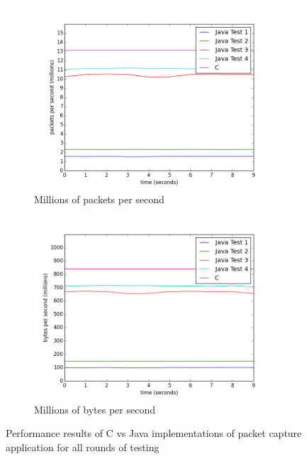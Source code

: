 \documentclass[final_report.tex]{subfiles}
\begin{document}
\begin{figure}[H]
	\centering
	\begin{subfigure}{0.5\textwidth}
		\includegraphics[width=\textwidth]{../../data/pctest1/packets.png}
		\caption{Millions of packets per second}
		\label{fig:cappackets}
	\end{subfigure}%
	\begin{subfigure}{0.5\textwidth}
		\includegraphics[width=\textwidth]{../../data/pctest1/bytes.png}
		\caption{Millions of bytes per second}
		\label{fig:capbytes}
	\end{subfigure}
	\caption{Performance results of C vs Java implementations of packet capture application for all rounds of testing}
	\label{fig:cap}
\end{figure}
\end{document}
